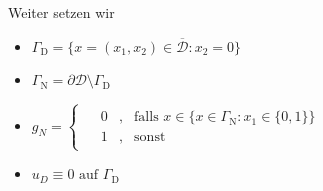 Weiter setzen wir
\begin{itemize}
	\item $\Gamma_{\text{D}} = \{ x = (x_1,x_2) \in \overline{\mathcal{D}} : x_2 = 0 \} $
	\item $ \Gamma_{\text{N}} = \partial \mathcal{D} \setminus \Gamma_{\text{D}} $
	\item $ g_N = \begin{cases}
						\begin{array}{llll}
						    &0 &, &\text{falls } x \in \{ x \in \Gamma_{\text{N}} : x_1 \in \{ 0,1 \}  \} \\
						    &1 &,& \text{sonst}
						\end{array}
				  \end{cases} $
	\item $ u_D \equiv 0 \text{ auf } \Gamma_{\text{D}} $
	
\end{itemize}

